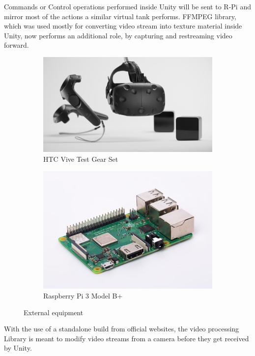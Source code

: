 Commands or Control operations performed inside Unity will be sent to R-Pi and mirror most of the actions a similar virtual tank performs.
FFMPEG library, which was used mostly for converting video stream into texture material inside Unity, now performs an additional role, by capturing and restreaming video forward.
\begin{figure}[H]
	\centering
	\begin{subfigure}[b]{0.4\textwidth}
		\includegraphics[width=\textwidth]{background/fig/vive-cne-featured.jpg}
		\caption{HTC Vive Test Gear Set}
		\label{fig:vive}
	\end{subfigure}
	\begin{subfigure}[b]{0.4\textwidth}
		\includegraphics[width=\textwidth]{background/fig/pi.jpg}
		\caption{Raspberry Pi 3 Model B+}
		\label{fig:camera}
	\end{subfigure}        
	\caption{External equipment}\label{fig:T34}
\end{figure}
With the use of a standalone build from official websites, the video processing Library is meant to modify video streams from a camera before they get received by Unity. 
